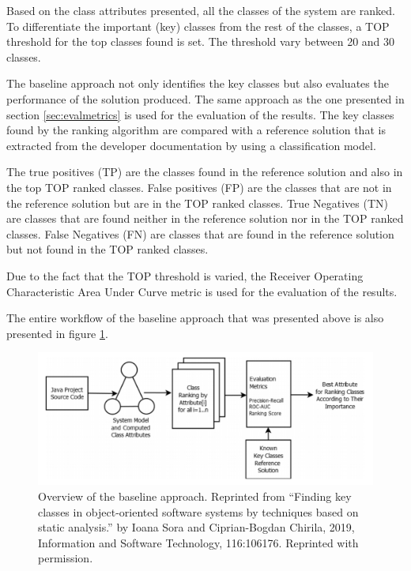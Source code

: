 \documentclass[12pt, a4paper, twoside]{report}
\begin{document}
Based on the class attributes presented, all the classes of the system are ranked. To differentiate the important (key) classes from the rest of the classes, a TOP threshold for the top classes found is set. 
The threshold vary between 20 and 30 classes.



The baseline approach not only identifies the key classes but also evaluates the performance of the solution produced. 
The same approach as the one presented in section \ref{sec:evalmetrics} is used for the evaluation of the results. The key classes found by the ranking algorithm are compared with a reference solution that is extracted from the developer documentation by using a classification model.

The true positives (TP) are the classes found in the reference solution and also in the top TOP ranked classes. False positives (FP) are the classes that are not in the reference solution but are in the TOP ranked classes.
True Negatives (TN) are classes that are found neither in the reference solution nor in the TOP ranked classes. False Negatives (FN) are classes that are found in the reference solution but not found in the TOP ranked classes.


Due to the fact that the TOP threshold is varied, the Receiver Operating Characteristic Area Under Curve metric is used for the evaluation of the results.

The entire workflow of the baseline approach that was presented above is also presented in figure \ref{fig:baseline_approach}.

\begin{figure}[H]
\centering
\includegraphics[width=\textwidth]{baseline_approach.PNG}
\caption{Overview of the baseline approach. Reprinted from “Finding key classes in object-oriented
software systems by techniques based on static analysis.” by Ioana Sora and Ciprian-Bogdan Chirila, 2019, Information and Software Technology, 116:106176. Reprinted with permission. }
\label{fig:baseline_approach}
\centering
\end{figure}
\end{document}
